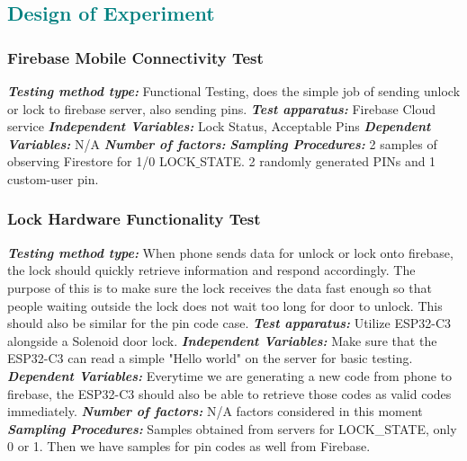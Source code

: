 \documentclass[a4paper,12pt]{article}
\begin{document}
\textcolor{teal}{\subsection*{Design of Experiment}}
\subsubsection{Firebase Mobile Connectivity Test}
\textbf{\textit{Testing method type:}} Functional Testing, does the simple job of sending unlock or lock to firebase server, also sending pins.
\newline
\textbf{\textit{Test apparatus:}} Firebase Cloud service
\newline
\textbf{\textit{Independent Variables:}} Lock Status, Acceptable Pins
\newline
\textbf{\textit{Dependent Variables:}} N/A
\newline
\textbf{\textit{Number of factors:}}
\newline
\textbf{\textit{Sampling Procedures:}} 2 samples of observing Firestore for 1/0 LOCK$\_$STATE. 2 randomly generated PINs and 1 custom-user pin.

\subsubsection{Lock Hardware Functionality Test}
\textbf{\textit{Testing method type:}} When phone sends data for unlock or lock onto firebase, the lock should quickly retrieve information and respond accordingly. The purpose of this is to make sure the lock receives the data fast enough so that people waiting outside the lock does not wait too long for door to unlock. This should also be similar for the pin code case.
\newline
\textbf{\textit{Test apparatus:}} Utilize ESP32-C3 alongside a Solenoid door lock.
\newline
\textbf{\textit{Independent Variables:}} Make sure that the ESP32-C3 can read a simple "Hello world" on the server for basic testing.
\newline
\textbf{\textit{Dependent Variables:}} Everytime we are generating a new code from phone to firebase, the ESP32-C3 should also be able to retrieve those codes as valid codes immediately.
\newline
\textbf{\textit{Number of factors:}} N/A factors considered in this moment
\newline
\textbf{\textit{Sampling Procedures:}} Samples obtained from servers for LOCK\_STATE, only 0 or 1. Then we have samples for pin codes as well from Firebase.
\newline
\end{document}
